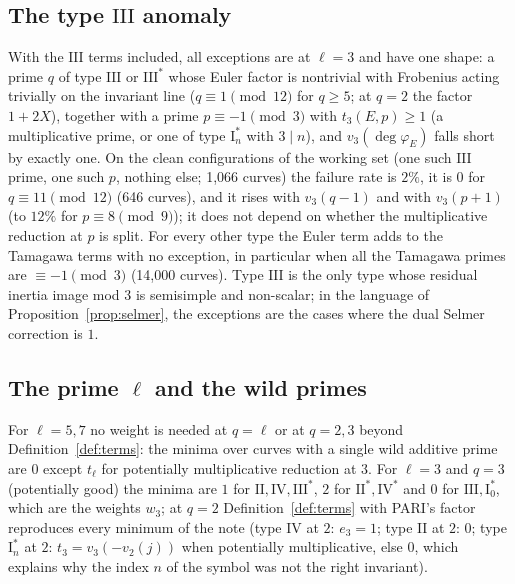 \documentclass[11pt]{amsart}
\theoremstyle{definition}
\newcommand{\degphi}{\deg\varphi_E}\newcommand{\Gal}{\operatorname{Gal}}\newcommand{\ad}{\operatorname{ad}^0}
\begin{document}
\begin{table}[ht]\centering\footnotesize

\caption{The Euler-factor rule with PARI's factors at all primes: curves with positive bound, violations and equality rate for \eqref{eq:rule}; violations when the $\mathrm{III}$ terms are added at every prime (``$+\mathrm{III}$''); violations and equality rate without the weights at $q=\ell$ (``no $q=\ell$'').}\label{tab:uniform}
\end{table}

\subsection{The type \texorpdfstring{$\mathrm{III}$}{III} anomaly}\label{sec:anomaly}
With the $\mathrm{III}$ terms included, all exceptions are at $\ell=3$ and have one shape: a prime $q$ of type $\mathrm{III}$ or $\mathrm{III}^*$ whose Euler factor is nontrivial with Frobenius acting trivially on the invariant line ($q\equiv1\pmod{12}$ for $q\ge5$; at $q=2$ the factor $1+2X$), together with a prime $p\equiv-1\pmod3$ with $t_3(E,p)\ge1$ (a multiplicative prime, or one of type $\mathrm{I}_n^*$ with $3\mid n$), and $v_3(\degphi)$ falls short by exactly one. On the clean configurations of the working set (one such $\mathrm{III}$ prime, one such $p$, nothing else; 1,066 curves) the failure rate is $2\%$, it is $0$ for $q\equiv11\pmod{12}$ (646 curves), and it rises with $v_3(q-1)$ and with $v_3(p+1)$ (to $12\%$ for $p\equiv8\pmod9$); it does not depend on whether the multiplicative reduction at $p$ is split. For every other type the Euler term adds to the Tamagawa terms with no exception, in particular when all the Tamagawa primes are $\equiv-1\pmod3$ (14,000 curves). Type $\mathrm{III}$ is the only type whose residual inertia image mod $3$ is semisimple and non-scalar; in the language of Proposition~\ref{prop:selmer}, the exceptions are the cases where the dual Selmer correction is $1$.

\subsection{The prime \texorpdfstring{$\ell$}{l} and the wild primes}
For $\ell=5,7$ no weight is needed at $q=\ell$ or at $q=2,3$ beyond Definition~\ref{def:terms}: the minima over curves with a single wild additive prime are $0$ except $t_\ell$ for potentially multiplicative reduction at $3$. For $\ell=3$ and $q=3$ (potentially good) the minima are $1$ for $\mathrm{II},\mathrm{IV},\mathrm{III}^*$, $2$ for $\mathrm{II}^*,\mathrm{IV}^*$ and $0$ for $\mathrm{III},\mathrm{I}_0^*$, which are the weights $w_3$; at $q=2$ Definition~\ref{def:terms} with PARI's factor reproduces every minimum of the note (type $\mathrm{IV}$ at $2$: $e_3=1$; type $\mathrm{II}$ at $2$: $0$; type $\mathrm{I}_n^*$ at $2$: $t_3=v_3(-v_2(j))$ when potentially multiplicative, else $0$, which explains why the index $n$ of the symbol was not the right invariant).
\end{document}
